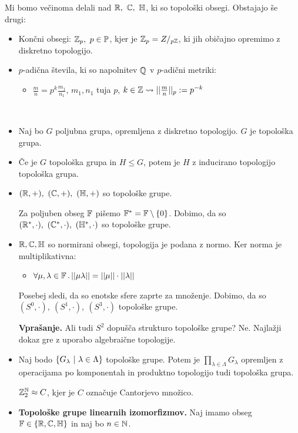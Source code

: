 Mi bomo večinoma delali nad \(\R, \ \C, \ \HH\), ki so topološki obsegi. Obstajajo še drugi:
\begin{itemize}
    \item Končni obsegi: \(\mathbb{Z}_p, \ p \in \mathbb{P}\), kjer je \(\mathbb{Z}_p = Z/_{p\mathbb{Z}}\), ki jih običajno opremimo z diskretno topologijo.
    \item \(p\)-adična števila, ki so napolnitev \(\mathbb{Q}\) v \(p\)-adični metriki:
    \begin{itemize}
        \item \(\frac{m}{n} = p^k \frac{m_1}{n_1}\), \(m_1, n_1\) tuja \(p\), \(k \in \mathbb{Z} \leadsto ||\frac{m}{n}||_p := p^{-k}\)
    \end{itemize}
\end{itemize}

\begin{primer} \
    \begin{itemize}
        \item Naj bo \(G\) poljubna grupa, opremljena z diskretno topologijo. \(G\) je topološka grupa.
        \item Če je \(G\) topološka grupa in \(H \leq G\), potem je \(H\) z inducirano topologijo topološka grupa.
        \item \((\mathbb{R}, +), \ (\mathbb{C}, +), \ (\mathbb{H}, +)\) so topološke grupe.
        
        Za poljuben obseg \(\mathbb{F}\) pišemo \(\mathbb{F}^* = \mathbb{F} \setminus \left\{0\right\}\). Dobimo, da so \((\mathbb{R}^*, \cdot), \ (\mathbb{C}^*, \cdot), \ (\mathbb{H}^*, \cdot)\) so topološke grupe.
        \item \(\mathbb{R}, \mathbb{C}, \mathbb{H}\) so normirani obsegi, topologija je podana z normo. Ker norma je multiplikativna:
        \begin{itemize}
            \item \(\forall \mu, \lambda \in \mathbb{F} \,.\, ||\mu \lambda|| = ||\mu|| \cdot ||\lambda||\)
        \end{itemize}
        Posebej sledi, da so enotske sfere zaprte za množenje. Dobimo, da so \((S^0, \cdot), \ (S^1, \cdot), \ (S^3, \cdot)\) topološke grupe.
        
        \textbf{Vprašanje.} Ali tudi \(S^2\) dopušča strukturo topološke grupe? Ne. Najlažji dokaz gre z uporabo algebraične topologije.
        \item Naj bodo \(\left\{G_\lambda \ | \ \lambda \in \Lambda\right\}\) topološke grupe. Potem je \(\prod_{\lambda \in \Lambda} G_\lambda\) opremljen z operacijama po komponentah in produktno topologijo tudi topološka grupa.
        \begin{primer}
            \(\mathbb{Z}_2^{\mathbb{N}} \approx C\), kjer je \(C\) označuje Cantorjevo množico.
        \end{primer}
        \item \textbf{Topološke grupe linearnih izomorfizmov.} Naj imamo obseg \(\mathbb{F} \in \left\{\mathbb{R}, \mathbb{C}, \mathbb{H}\right\}\) in naj bo \(n \in \mathbb{N}\).
        

\end{itemize}
\end{primer}

